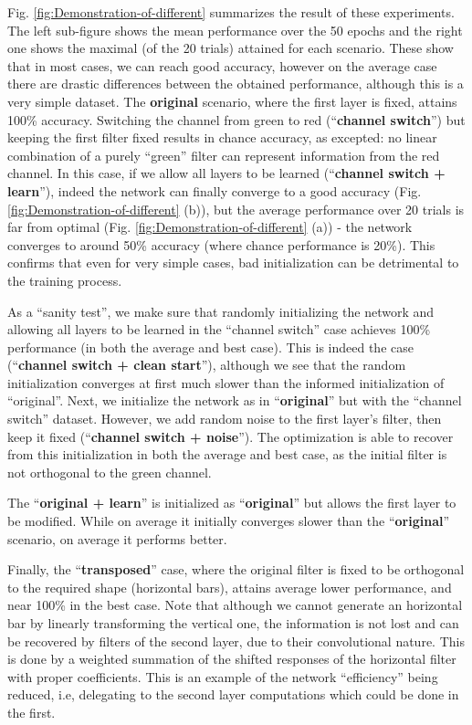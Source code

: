 \documentclass[10pt,journal,compsoc]{IEEEtran}
\begin{document}
Fig. \ref{fig:Demonstration-of-different} summarizes the result of
these experiments. The left sub-figure shows the mean performance
over the 50 epochs and the right one shows the maximal (of the 20
trials) attained for each scenario. These show that in most cases,
we can reach good accuracy, however on the average case there are
drastic differences between the obtained performance, although this
is a very simple dataset. The \textbf{original} scenario, where the
first layer is fixed, attains 100\% accuracy. Switching the channel
from green to red (``\textbf{channel switch}'') but keeping the
first filter fixed results in chance accuracy, as excepted: no linear
combination of a purely ``green'' filter can represent information
from the red channel. In this case, if we allow all layers to be learned
(``\textbf{channel switch + learn}''), indeed the network can finally
converge to a good accuracy (Fig. \ref{fig:Demonstration-of-different}
(b)), but the average performance over 20 trials is far from optimal
(Fig. \ref{fig:Demonstration-of-different} (a)) - the network converges
to around 50\% accuracy (where chance performance is 20\%). This confirms
that even for very simple cases, bad initialization can be detrimental
to the training process. 

As a ``sanity test'', we make sure that randomly initializing the
network and allowing all layers to be learned in the ``channel switch''
case achieves 100\% performance (in both the average and best case).
This is indeed the case (``\textbf{channel switch + clean start}''),
although we see that the random initialization converges at first
much slower than the informed initialization of ``original''. Next,
we initialize the network as in ``\textbf{original}'' but with the
``channel switch'' dataset. However, we add random noise to the
first layer's filter, then keep it fixed (``\textbf{channel switch
+ noise}''). The optimization is able to recover from this initialization
in both the average and best case, as the initial filter is not orthogonal
to the green channel. 

The ``\textbf{original + learn}'' is initialized as ``\textbf{original}''
but allows the first layer to be modified. While on average it initially
converges slower than the ``\textbf{original}'' scenario, on average
it performs better. 

Finally, the ``\textbf{transposed}'' case, where the original filter
is fixed to be orthogonal to the required shape (horizontal bars),
attains average lower performance, and near 100\% in the best case.
Note that although we cannot generate an horizontal bar by linearly
transforming the vertical one, the information is not lost and can
be recovered by filters of the second layer, due to their convolutional
nature. This is done by a weighted summation of the shifted responses
of the horizontal filter with proper coefficients. This is an example
of the network ``efficiency'' being reduced, i.e, delegating to
the second layer computations which could be done in the first. 
\end{document}

